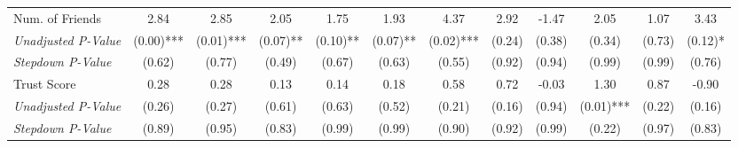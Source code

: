 \begin{tabular}{l c c c c c c c c c c c}
Num. of Friends & 2.84 & 2.85 & 2.05 & 1.75 & 1.93 & 4.37 & 2.92 & -1.47 & 2.05 & 1.07 & 3.43 \\
\quad \textit{Unadjusted P-Value} & (0.00)*** & (0.01)*** & (0.07)** & (0.10)** & (0.07)** & (0.02)*** & (0.24) & (0.38) & (0.34) & (0.73) & (0.12)* \\
\quad \textit{Stepdown P-Value} & (0.62) & (0.77) & (0.49) & (0.67) & (0.63) & (0.55) & (0.92) & (0.94) & (0.99) & (0.99) & (0.76) \\
Trust Score & 0.28 & 0.28 & 0.13 & 0.14 & 0.18 & 0.58 & 0.72 & -0.03 & 1.30 & 0.87 & -0.90 \\
\quad \textit{Unadjusted P-Value} & (0.26) & (0.27) & (0.61) & (0.63) & (0.52) & (0.21) & (0.16) & (0.94) & (0.01)*** & (0.22) & (0.16) \\
\quad \textit{Stepdown P-Value} & (0.89) & (0.95) & (0.83) & (0.99) & (0.99) & (0.90) & (0.92) & (0.99) & (0.22) & (0.97) & (0.83) \\
\bottomrule
\end{tabular}
